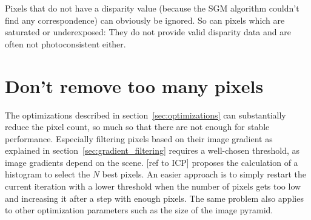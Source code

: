 Pixels that do not have a disparity value (because the SGM algorithm couldn't
find any correspondence) can obviously be ignored. So can pixels which are
saturated or underexposed: They do not provide valid disparity data and are
often not photoconsistent either.

\section{Don't remove too many pixels}

The optimizations described in section~\ref{sec:optimizations} can
substantially reduce the pixel count, so much so that there are not enough for
stable performance. Especially filtering pixels based on their image gradient
as explained in section~\ref{sec:gradient_filtering} requires a well-chosen
threshold, as image gradients depend on the scene. [ref to ICP] proposes the
calculation of a histogram to select the $N$ best pixels. An easier approach is
to simply restart the current iteration with a lower threshold when the number
of pixels gets too low and increasing it after a step with enough pixels. The
same problem also applies to other optimization parameters such as the size of
the image pyramid.
